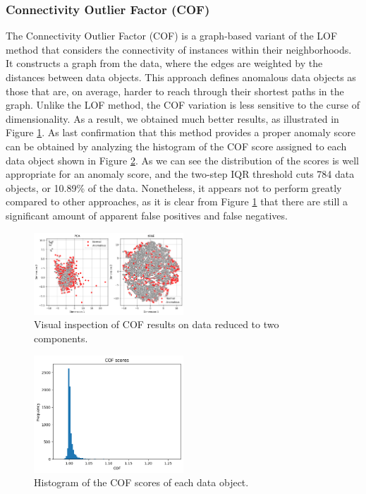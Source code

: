 \documentclass[9pt,twocolumn]{article}
\begin{document}
\subsubsection{Connectivity Outlier Factor (COF)} %
The Connectivity Outlier Factor (COF) is a graph-based variant of the LOF method that considers the connectivity of instances within their neighborhoods. It constructs a graph from the data, where the edges are weighted by the distances between data objects. This approach defines anomalous data objects as those that are, on average, harder to reach through their shortest paths in the graph.
Unlike the LOF method, the COF variation is less sensitive to the curse of dimensionality. As a result, we obtained much better results, as illustrated in Figure \ref{fig:cof_pcatsne}. As last confirmation that this method provides a proper anomaly score can be obtained by analyzing the histogram of the COF score assigned to each data object shown in Figure \ref{fig:cof_scores}. As we can see the distribution of the scores is well appropriate for an anomaly score, and the two-step IQR threshold cuts 784 data objects, or 10.89\% of the data. Nonetheless, it appears not to perform greatly compared to other approaches, as it is clear from Figure \ref{fig:cof_pcatsne} that there are still a significant amount of apparent false positives and false negatives.
\begin{figure}[h]
    \centering
    \includegraphics[width=0.5\textwidth]{images/COF_PCATSNE.png}
    \caption{Visual inspection of COF results on data reduced to two components.}
    \label{fig:cof_pcatsne}
\end{figure}

\begin{figure}[h]
    \centering
    \includegraphics[width=0.5\textwidth]{images/COF_scorehist.png}
    \caption{Histogram of the COF scores of each data object.}
    \label{fig:cof_scores}
 \end{figure}
\end{document}
